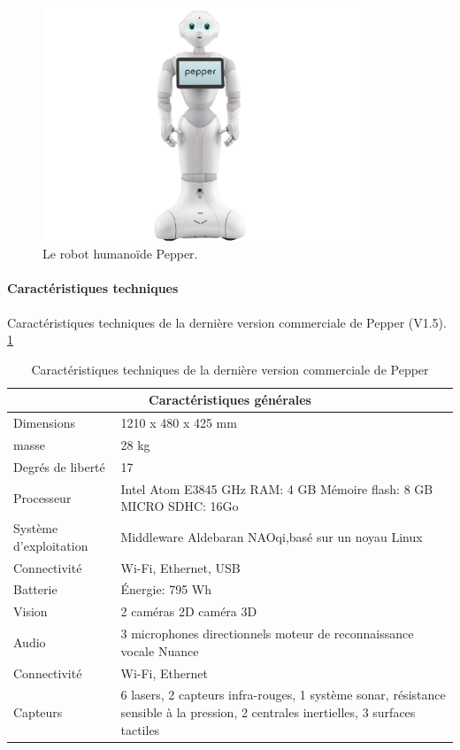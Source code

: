 \begin{figure}[h]
	\centering\includegraphics[height=7cm]{images/pepper.jpg}
	\caption{Le robot humanoïde Pepper.}
	\label{fig:Robot humanoïde Pepper}
\end{figure}

\paragraph{Caractéristiques techniques}
Caractéristiques techniques de la dernière version commerciale de Pepper (V1.5). \ref{tab: Caractéristiques technique de Pepper}

\begin{table}[h]
\begin{tabular}{ | l | p{8cm} | }
	\hline
	\multicolumn{2}{|c|}{Caractéristiques générales} \\
	\hline
	Dimensions & 1210 x 480 x 425 mm \\
	\hline 
	masse & 28 kg \\
	\hline 
	Degrés de liberté  & 17 \\
	\hline
	Processeur & Intel Atom E3845 \newline 1.91 GHz \newline RAM: 4 GB \newline Mémoire flash: 8 GB \newline MICRO SDHC: 16Go  \\
	\hline
	Système d'exploitation & Middleware Aldebaran NAOqi,\newline basé sur un noyau Linux \\
	\hline
	Connectivité & Wi-Fi, Ethernet, USB \\
	\hline
	Batterie & Énergie: 795 Wh \\
	\hline 
	Vision & 2 caméras 2D \newline 1 caméra 3D \\
	\hline
	Audio & 3 microphones directionnels \newline moteur de reconnaissance vocale Nuance  \\
	\hline
	Connectivité & Wi-Fi, Ethernet \\
	\hline
	Capteurs & 6 lasers, 2 capteurs infra-rouges, 1 système sonar, résistance sensible à la pression, 2 centrales inertielles, 3 surfaces tactiles \\
	\hline
\end{tabular}
\caption[Caractéristiques technique de Pepper]{Caractéristiques techniques de la dernière version commerciale  de Pepper}
\label {tab: Caractéristiques technique de Pepper}
\end{table}

